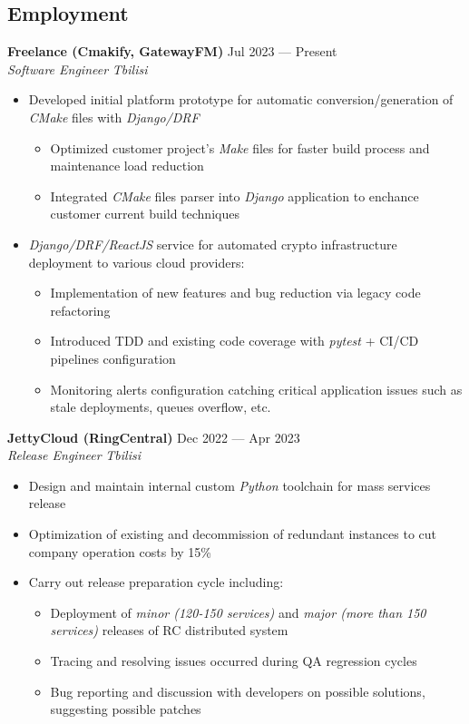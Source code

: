 \documentclass[10pt]{report}
\newenvironment{JobDescription}[5]{
    \vspace{ #5 }
    \flushleft
    {\bf #1 } \hfill { #2 }
    \\
    {\em #3 } \hfill {\em #4 }
    \begin{itemize}
} {
    \end{itemize}
}
\begin{document}
\subsection*{Employment}
\begin{JobDescription}{Freelance (Cmakify, GatewayFM)}{Jul 2023 --- Present}{Software Engineer}{Tbilisi}{2mm}
    \item Developed initial platform prototype for automatic conversion/generation of \emph{CMake} files with
        \emph{Django/DRF}
    \begin{itemize}
        \item Optimized customer project's \emph{Make} files for faster build process and maintenance load reduction
        \item Integrated \emph{CMake} files parser into \emph{Django} application to enchance customer current build techniques
    \end{itemize}
    \item \emph{Django/DRF/ReactJS} service for automated crypto infrastructure deployment to various cloud providers:
    \begin{itemize}
        \item Implementation of new features and bug reduction via legacy code refactoring
        \item Introduced TDD and existing code coverage with \emph{pytest} + CI/CD pipelines configuration
        \item Monitoring alerts configuration catching critical application issues such as stale deployments, queues
            overflow, etc.
    \end{itemize}
\end{JobDescription}

\begin{JobDescription}{JettyCloud (RingCentral)}{Dec 2022 --- Apr 2023}{Release Engineer}{Tbilisi}{2mm}
    \item Design and maintain internal custom \emph{Python} toolchain for mass services release
    \item Optimization of existing and decommission of redundant instances to cut company operation costs by 15\%
    \item Carry out release preparation cycle including:
    \begin{itemize}
        \item Deployment of \emph{minor (120-150 services)} and \emph{major (more than 150 services)} releases of RC distributed system
        \item Tracing and resolving issues occurred during QA regression cycles
        \item Bug reporting and discussion with developers on possible solutions, suggesting possible patches
    \end{itemize}
\end{JobDescription}
\end{document}
